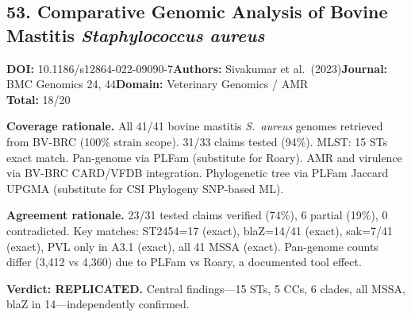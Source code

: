 \subsection{53. Comparative Genomic Analysis of Bovine Mastitis \textit{Staphylococcus aureus}}
\textbf{DOI:} 10.1186/s12864-022-09090-7\quad\textbf{Authors:} Sivakumar et al.\ (2023)\quad\textbf{Journal:} BMC Genomics 24, 44\quad\textbf{Domain:} Veterinary Genomics / AMR\\
\quad{}\quad\textbf{Total:} 18/20\par\smallskip
\noindent\textbf{Coverage rationale.} All 41/41 bovine mastitis \textit{S.\ aureus} genomes retrieved from BV-BRC (100\% strain scope). 31/33 claims tested (94\%). MLST: 15 STs exact match. Pan-genome via PLFam (substitute for Roary). AMR and virulence via BV-BRC CARD/VFDB integration. Phylogenetic tree via PLFam Jaccard UPGMA (substitute for CSI Phylogeny SNP-based ML).\par
\noindent\textbf{Agreement rationale.} 23/31 tested claims verified (74\%), 6 partial (19\%), 0 contradicted. Key matches: ST2454=17 (exact), blaZ=14/41 (exact), sak=7/41 (exact), PVL only in A3.1 (exact), all 41 MSSA (exact). Pan-genome counts differ (3,412 vs 4,360) due to PLFam vs Roary, a documented tool effect.\par\smallskip
\noindent\textbf{Verdict: REPLICATED.} Central findings---15 STs, 5 CCs, 6 clades, all MSSA, blaZ in 14---independently confirmed.

